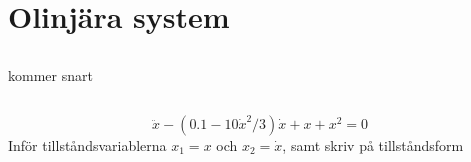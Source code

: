 \section{Olinjära system}
\subsection{} kommer snart

\subsection{}
$$
\ddot{x} - (0.1-10\dot{x}^2/3)\dot{x} + x + x^2=0
$$
Inför tillståndsvariablerna
$x_1 = x $ och $x_2 = \dot{x} $, samt skriv på
tillståndsform

